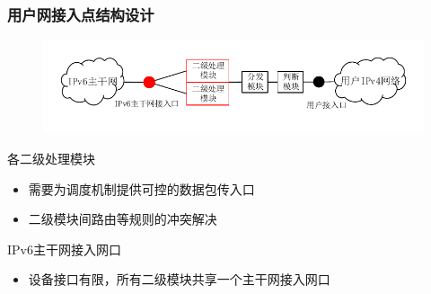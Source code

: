 \documentclass{beamer}
\begin{document}
\begin{frame}
  \frametitle{用户网接入点结构设计}
  \begin{figure}
    \includegraphics[width=\textwidth]{figs/10-user-access-point-c.pdf}
  \end{figure}
  \vspace{-1em}

  \begin{block}{各二级处理模块}
    \begin{itemize}
    \item 需要为调度机制提供可控的数据包传入口
    \item 二级模块间路由等规则的冲突解决
    \end{itemize}
  \end{block}

  \begin{block}{IPv6主干网接入网口}
    \begin{itemize}
    \item 设备接口有限，所有二级模块共享一个主干网接入网口
    \end{itemize}
  \end{block}
\end{frame}
\end{document}
